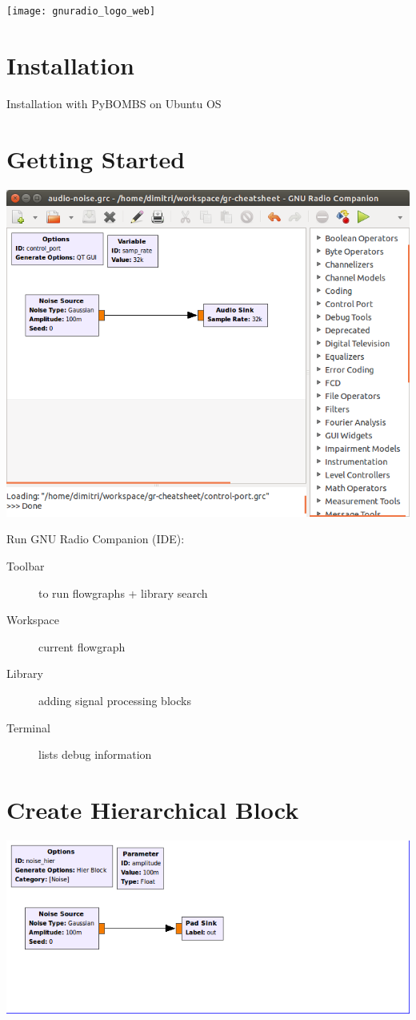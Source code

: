 \documentclass[10pt]{article}
\begin{document}
\texttt{[image: gnuradio\_logo\_web]}


\begin{multicols*}{3}


\section*{Installation}
Installation with PyBOMBS on Ubuntu OS


\section*{Getting Started}

\includegraphics[width=0.99\linewidth]{./grc-screenshot}

Run GNU Radio Companion (IDE):
\begin{description}
\item[Toolbar] to run flowgraphs + library search
\item[Workspace] current flowgraph
\item[Library] adding signal processing blocks
\item[Terminal] lists debug information
\end{description}

\section*{Create Hierarchical Block}

\includegraphics[width=0.99\linewidth]{./noise-hier.png}


\end{multicols*}
\end{document}
